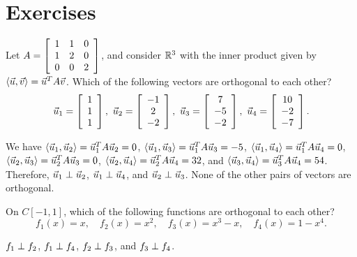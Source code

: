 \documentclass{ximera}
\author{Zack Reed}
\begin{document}
\section*{Exercises}

\begin{exercise}
  Let $A=\startmat{ccc} 1 & 1 & 0 \\ 1 & 2 & 0 \\ 0 & 0 & 2 \stopmat$, and consider $\R^3$ with the inner product given by
  $\iprod{\vect{u},\vect{v}} = \vect{u}^TA\vect{v}$. Which of the
  following vectors are orthogonal to each other?
  \begin{equation*}
    \vect{u}_1 = \startmat{c}  1 \\  1 \\  1 \stopmat,\quad
    \vect{u}_2 = \startmat{c} -1 \\  2 \\ -2 \stopmat,\quad
    \vect{u}_3 = \startmat{c}  7 \\ -5 \\ -2 \stopmat,\quad
    \vect{u}_4 = \startmat{c} 10 \\ -2 \\ -7 \stopmat.
  \end{equation*}
  \begin{solution}
    We have
    $\iprod{\vect{u}_1,\vect{u}_2} = \vect{u}_1^T A \vect{u}_2 = 0$,
    $\iprod{\vect{u}_1,\vect{u}_3} = \vect{u}_1^T A \vect{u}_3 = -5$,
    $\iprod{\vect{u}_1,\vect{u}_4} = \vect{u}_1^T A \vect{u}_4 = 0$,
    $\iprod{\vect{u}_2,\vect{u}_3} = \vect{u}_2^T A \vect{u}_3 = 0$,
    $\iprod{\vect{u}_2,\vect{u}_4} = \vect{u}_2^T A \vect{u}_4 = 32$,
    and
    $\iprod{\vect{u}_3,\vect{u}_4} = \vect{u}_3^T A \vect{u}_4 = 54$.
    Therefore, $\vect{u}_1\orth\vect{u}_2$,
    $\vect{u}_1\orth\vect{u}_4$, and $\vect{u}_2\orth\vect{u}_3$. None
    of the other pairs of vectors are orthogonal.
  \end{solution}
\end{exercise}

\begin{exercise}
  On $C[-1,1]$, which of the following functions are orthogonal to each other?
  \begin{equation*}
    f_1(x) = x,\quad
    f_2(x) = x^2,\quad
    f_3(x) = x^3-x,\quad
    f_4(x) = 1-x^4.
  \end{equation*}
  \begin{solution}
    $f_1\orth f_2$, $f_1\orth f_4$, $f_2\orth f_3$, and $f_3\orth f_4$.
  \end{solution}
\end{exercise}
\end{document}
